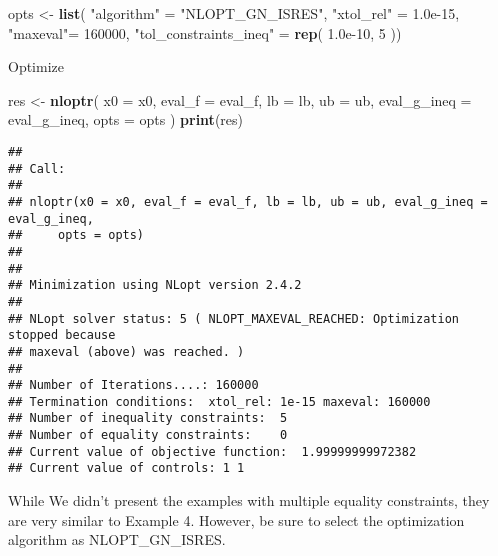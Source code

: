 \documentclass[onecolumn]{article}
\newenvironment{Shaded}{\begin{snugshade}}{\end{snugshade}}
\newcommand{\KeywordTok}[1]{\textcolor[rgb]{0.13,0.29,0.53}{\textbf{#1}}}
\newcommand{\DataTypeTok}[1]{\textcolor[rgb]{0.13,0.29,0.53}{#1}}
\newcommand{\DecValTok}[1]{\textcolor[rgb]{0.00,0.00,0.81}{#1}}
\newcommand{\FloatTok}[1]{\textcolor[rgb]{0.00,0.00,0.81}{#1}}
\newcommand{\StringTok}[1]{\textcolor[rgb]{0.31,0.60,0.02}{#1}}
\newcommand{\NormalTok}[1]{#1}
\begin{document}
\begin{Shaded}
\begin{Highlighting}[]
\NormalTok{ opts <-}\StringTok{ }\KeywordTok{list}\NormalTok{( }\StringTok{"algorithm"}\NormalTok{            =}\StringTok{ "NLOPT_GN_ISRES"}\NormalTok{,}
                  \StringTok{"xtol_rel"}\NormalTok{             =}\StringTok{ }\FloatTok{1.0e-15}\NormalTok{,}
               \StringTok{"maxeval"}\NormalTok{=}\StringTok{ }\DecValTok{160000}\NormalTok{,}
                  \StringTok{"tol_constraints_ineq"}\NormalTok{ =}\StringTok{ }\KeywordTok{rep}\NormalTok{( }\FloatTok{1.0e-10}\NormalTok{, }\DecValTok{5}\NormalTok{ ))}
\end{Highlighting}
\end{Shaded}

Optimize

\begin{Shaded}
\begin{Highlighting}[]
\NormalTok{res <-}\StringTok{ }\KeywordTok{nloptr}\NormalTok{(}
        \DataTypeTok{x0          =}\NormalTok{ x0,}
        \DataTypeTok{eval_f      =}\NormalTok{ eval_f,}
        \DataTypeTok{lb          =}\NormalTok{ lb,}
        \DataTypeTok{ub          =}\NormalTok{ ub,}
        \DataTypeTok{eval_g_ineq =}\NormalTok{ eval_g_ineq,}
        \DataTypeTok{opts        =}\NormalTok{ opts )}
\KeywordTok{print}\NormalTok{(res)}
\end{Highlighting}
\end{Shaded}

\begin{verbatim}
## 
## Call:
## 
## nloptr(x0 = x0, eval_f = eval_f, lb = lb, ub = ub, eval_g_ineq = eval_g_ineq, 
##     opts = opts)
## 
## 
## Minimization using NLopt version 2.4.2 
## 
## NLopt solver status: 5 ( NLOPT_MAXEVAL_REACHED: Optimization stopped because 
## maxeval (above) was reached. )
## 
## Number of Iterations....: 160000 
## Termination conditions:  xtol_rel: 1e-15 maxeval: 160000 
## Number of inequality constraints:  5 
## Number of equality constraints:    0 
## Current value of objective function:  1.99999999972382 
## Current value of controls: 1 1
\end{verbatim}

While We didn't present the examples with multiple equality constraints,
they are very similar to Example 4. However, be sure to select the
optimization algorithm as NLOPT\_GN\_ISRES.

\renewcommand\refname{References}

\end{document}
